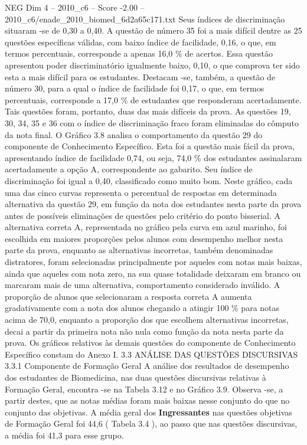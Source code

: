 \begin{textsample}{NEG Dim 4 – 2010\_c6 – Score -2.00 – 2010\_c6/enade\_2010\_biomed\_6d2a65c171.txt}
Seus índices de discriminação situaram -se de 0,30 a 0,40.
A questão de número 35 foi a mais difícil dentre as 25 questões específicas válidas, com baixo índice de facilidade, 0,16, o que, em termos percentuais, corresponde a apenas 16,0 \% de acertos.
Essa questão apresentou poder discriminatório igualmente baixo, 0,10, o que comprova ter sido esta a mais difícil para os estudantes.
Destacam -se, também, a questão de número 30, para a qual o índice de facilidade foi 0,17, o que, em termos percentuais, corresponde a 17,0 \% de estudantes que responderam acertadamente.
Tais questões foram, portanto, duas das mais difíceis da prova.
As questões 19, 30, 34, 35 e 36 com o índice de discriminação fraco foram eliminadas do cômputo da nota final.
O Gráfico 3.8 analisa o comportamento da questão 29 do componente de Conhecimento Específico.
Esta foi a questão mais fácil da prova, apresentando índice de facilidade 0,74, ou seja, 74,0 \% dos estudantes assinalaram acertadamente a opção A, correspondente ao gabarito.
Seu índice de discriminação foi igual a 0,40, classificado como muito bom.
Neste gráfico, cada uma das cinco curvas representa o percentual de respostas em determinada alternativa da questão 29, em função da nota dos estudantes nesta parte da prova antes de possíveis eliminações de questões pelo critério do ponto bisserial.
A alternativa correta A, representada no gráfico pela curva em azul marinho, foi escolhida em maiores proporções pelos alunos com desempenho melhor nesta parte da prova, enquanto as alternativas incorretas, também denominadas distratores, foram selecionadas principalmente por aqueles com notas mais baixas, ainda que aqueles com nota zero, na sua quase totalidade deixaram em branco ou marcaram mais de uma alternativa, comportamento considerado inválido.
A proporção de alunos que selecionaram a resposta correta A aumenta gradativamente com a nota dos alunos chegando a atingir 100 \% para notas acima de 70,0, enquanto a proporção dos que escolhem alternativas incorretas, decai a partir da primeira nota não nula como função da nota nesta parte da prova.
Os gráficos relativos às demais questões do componente de Conhecimento Específico constam do Anexo I. 3.3 ANÁLISE DAS QUESTÕES DISCURSIVAS 3.3.1 Componente de Formação Geral A análise dos resultados de desempenho dos estudantes de Biomedicina, nas duas questões discursivas relativas à Formação Geral, encontra -se na Tabela 3.12 e no Gráfico 3.9.
Observa -se, a partir destes, que as notas médias foram mais baixas nesse conjunto do que no conjunto das objetivas.
A média geral dos \textbf{Ingressantes} nas questões objetivas de Formação Geral foi 44,6 ( Tabela 3.4 ), ao passo que nas questões discursivas, a média foi 41,3 para esse grupo.

\end{textsample}

